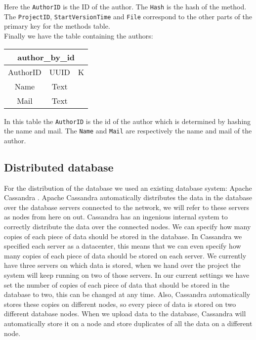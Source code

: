 \documentclass[../Main.tex]{subfiles}
\begin{document}
Here the \texttt{AuthorID} is the ID of the author. The \texttt{Hash} is the hash of the method. The \texttt{ProjectID}, \texttt{StartVersionTime} and \texttt{File} correspond to the other parts of the primary key for the methods table.\\

Finally we have the table containing the authors:

\begin{table}[h]
\centering
\begin{tabular}{|ccc|}
\hline
    \multicolumn{3}{|c|}{\textbf{author\_by\_id}}   \\
    \hline
    AuthorID & UUID & K \\
    Name & Text & \\
    Mail & Text & \\
    \hline
\end{tabular}
\end{table}

In this table the \texttt{AuthorID} is the id of the author which is determined by hashing the name and mail. The \texttt{Name} and \texttt{Mail} are respectively the name and mail of the author.

\subsection{Distributed database}
For the distribution of the database we used an existing database system: Apache Cassandra \cite{cassandra}. Apache Cassandra automatically distributes the data in the database over the database servers connected to the network, we will refer to these servers as nodes from here on out. Cassandra has an ingenious internal system to correctly distribute the data over the connected nodes. We can specify how many copies of each piece of data should be stored in the database. In Cassandra we specified each server as a datacenter, this means that we can even specify how many copies of each piece of data should be stored on each server. We currently have three servers on which data is stored, when we hand over the project the system will keep running on two of those servers. In our current settings we have set the number of copies of each piece of data that should be stored in the database to two, this can be changed at any time. Also, Cassandra automatically stores these copies on different nodes, so every piece of data is stored on two different database nodes. When we upload data to the database, Cassandra will automatically store it on a node and store duplicates of all the data on a different node. 
\end{document}
